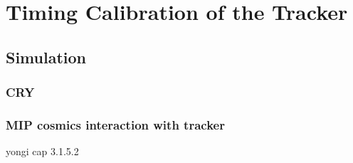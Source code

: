 \chapter{Timing Calibration of the Tracker}
\section{Simulation}
\subsection{CRY}
\subsection{MIP cosmics interaction with tracker}
yongi cap 3.1.5.2
